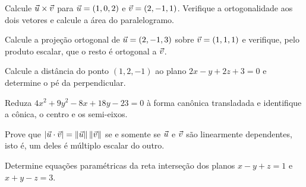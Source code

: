 \documentclass[11pt,a4paper]{article}
\begin{document}
\begin{exercicio}
Calcule $\vec{u}\times\vec{v}$ para $\vec{u}=(1,0,2)$ e $\vec{v}=(2,-1,1)$. Verifique a ortogonalidade aos dois vetores e calcule a área do paralelogramo.
\end{exercicio}

\begin{exercicio}
Calcule a projeção ortogonal de $\vec{u}=(2,-1,3)$ sobre $\vec{v}=(1,1,1)$ e verifique, pelo produto escalar, que o resto é ortogonal a $\vec{v}$.
\end{exercicio}

\begin{exercicio}
Calcule a distância do ponto $(1,2,-1)$ ao plano $2x-y+2z+3=0$ e determine o pé da perpendicular.
\end{exercicio}

\begin{exercicio}
Reduza $4x^2+9y^2-8x+18y-23=0$ à forma canônica transladada e identifique a cônica, o centro e os semi-eixos.
\end{exercicio}

\begin{exercicio}
Prove que $\left\lvert \vec{u}\cdot\vec{v} \right\rvert=\left\lVert \vec{u} \right\rVert\left\lVert \vec{v} \right\rVert$ se e somente se $\vec{u}$ e $\vec{v}$ são linearmente dependentes, isto é, um deles é múltiplo escalar do outro.
\end{exercicio}

\begin{exercicio}
Determine equações paramétricas da reta interseção dos planos $x-y+z=1$ e $x+y-z=3$.
\end{exercicio}
\end{document}
